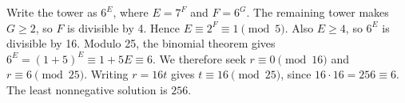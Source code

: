 Write the tower as $6^E$, where $E=7^F$ and $F=6^G$. The remaining tower makes $G\ge2$, so $F$ is divisible by 4. Hence $E\equiv2^F\equiv1\pmod5$. Also $E\ge4$, so $6^E$ is divisible by 16. Modulo 25, the binomial theorem gives $6^E=(1+5)^E\equiv1+5E\equiv6$. We therefore seek $r\equiv0\pmod{16}$ and $r\equiv6\pmod{25}$. Writing $r=16t$ gives $t\equiv16\pmod{25}$, since $16\cdot16=256\equiv6$. The least nonnegative solution is $\boxed{256}$.
